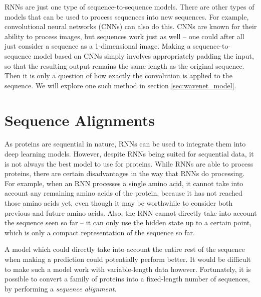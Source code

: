 RNNs are just one type of sequence-to-sequence models. There are other types of models that can be used to process sequences into new sequences. For example, convolutional neural networks (CNNs) can also do this. CNNs are known for their ability to process images, but sequences work just as well -- one could after all just consider a sequence as a 1-dimensional image. Making a sequence-to-sequence model based on CNNs simply involves appropriately padding the input, so that the resulting output remains the same length as the original sequence. Then it is only a question of how exactly the convolution is applied to the sequence. We will explore one such method in section \ref{sec:wavenet_model}.


\section{Sequence Alignments}
\label{sec:sequence_alignments}
As proteins are sequential in nature, RNNs can be used to integrate them into deep learning models. However, despite RNNs being suited for sequential data, it is not always the best model to use for proteins. While RNNs are able to process proteins, there are certain disadvantages in the way that RNNs do processing. For example, when an RNN processes a single amino acid, it cannot take into account any remaining amino acids of the protein, because it has not reached those amino acids yet, even though it may be worthwhile to consider both previous and future amino acids. Also, the RNN cannot directly take into account the sequence seen so far -- it can only use the hidden state up to a certain point, which is only a compact representation of the sequence so far.

A model which could directly take into account the entire rest of the sequence when making a prediction could potentially perform better. It would be difficult to make such a model work with variable-length data however. Fortunately, it is possible to convert a family of proteins into a fixed-length number of sequences, by performing a \textit{sequence alignment}.

